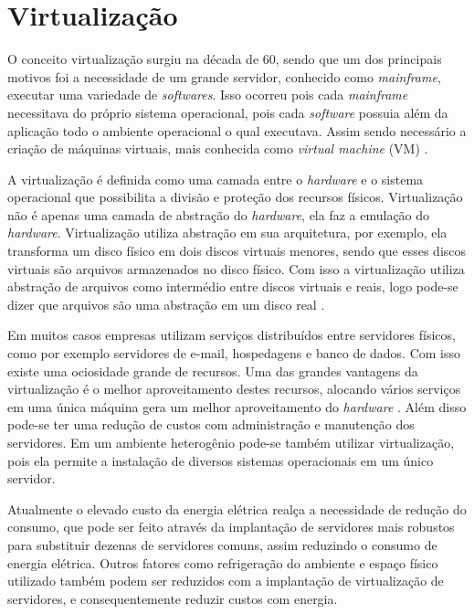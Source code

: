 \chapter{Virtualização}
\label{cap:virtualizacao}

O conceito virtualização surgiu na década de 60, sendo que um dos principais motivos foi a necessidade de um grande servidor,
conhecido como \textit{mainframe}, executar uma variedade de \textit{softwares}. Isso ocorreu pois cada \textit{mainframe} necessitava
do próprio sistema operacional, pois cada \textit{software} possuia além da aplicação todo o ambiente operacional o qual executava. Assim
sendo necessário a criação de máquinas virtuais, mais conhecida como \textit{virtual machine} (VM) \cite{carissimi2008}.

A virtualização é definida como uma camada entre o \textit{hardware} e o sistema operacional que possibilita a divisão e proteção
dos recursos físicos. Virtualização não é apenas uma camada de abstração do \textit{hardware}, ela faz a emulação do \textit{hardware}.
Virtualização utiliza abstração em sua arquitetura, por exemplo, ela transforma um disco físico em dois discos virtuais menores, 
sendo que esses discos virtuais são arquivos armazenados no disco físico. Com isso a virtualização utiliza abstração de arquivos como 
intermédio entre discos virtuais e reais, logo pode-se dizer que arquivos são uma abstração em um disco real \cite{smithenair2005}. 

Em muitos casos empresas utilizam serviços distribuídos entre servidores físicos, como por exemplo servidores de e-mail, hospedagens e 
banco de dados. Com isso existe uma ociosidade grande de recursos. Uma das grandes vantagens da virtualização é o melhor aproveitamento
destes recursos, alocando vários serviços em uma única máquina gera um melhor aproveitamento do \textit{hardware} \cite{moreira2006}.
Além disso pode-se ter uma redução de custos com administração e manutenção dos servidores. Em um ambiente heterogênio pode-se também
utilizar virtualização, pois ela permite a instalação de diversos sistemas operacionais em um único servidor.

Atualmente o elevado custo da energia elétrica realça a necessidade de redução do consumo, que pode ser feito através da implantação 
de servidores mais robustos para substituir dezenas de servidores comuns, assim reduzindo o consumo de energia elétrica. 
Outros fatores como refrigeração do ambiente e espaço físico utilizado também podem ser reduzidos com a implantação de virtualização de
servidores, e consequentemente reduzir custos com energia.

